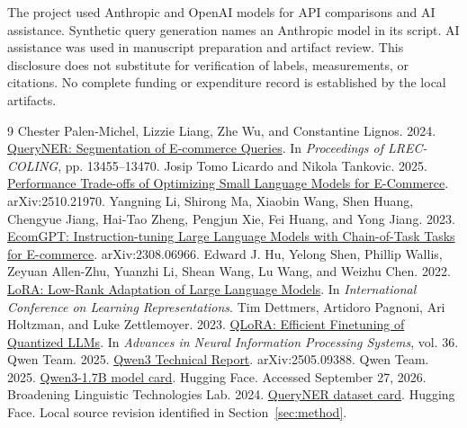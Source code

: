 \documentclass{article}
\begin{document}
\begin{ack}
The project used Anthropic and OpenAI models for API comparisons and AI assistance. Synthetic query generation names an Anthropic model in its script. AI assistance was used in manuscript preparation and artifact review. This disclosure does not substitute for verification of labels, measurements, or citations. No complete funding or expenditure record is established by the local artifacts.
\end{ack}

\begin{thebibliography}{9}
 Chester Palen-Michel, Lizzie Liang, Zhe Wu, and Constantine Lignos. 2024. \href{https://aclanthology.org/2024.lrec-main.1178/}{QueryNER: Segmentation of E-commerce Queries}. In \emph{Proceedings of LREC-COLING}, pp. 13455--13470.
 Josip Tomo Licardo and Nikola Tankovic. 2025. \href{https://arxiv.org/abs/2510.21970}{Performance Trade-offs of Optimizing Small Language Models for E-Commerce}. arXiv:2510.21970.
 Yangning Li, Shirong Ma, Xiaobin Wang, Shen Huang, Chengyue Jiang, Hai-Tao Zheng, Pengjun Xie, Fei Huang, and Yong Jiang. 2023. \href{https://arxiv.org/abs/2308.06966}{EcomGPT: Instruction-tuning Large Language Models with Chain-of-Task Tasks for E-commerce}. arXiv:2308.06966.
 Edward J. Hu, Yelong Shen, Phillip Wallis, Zeyuan Allen-Zhu, Yuanzhi Li, Shean Wang, Lu Wang, and Weizhu Chen. 2022. \href{https://arxiv.org/abs/2106.09685}{LoRA: Low-Rank Adaptation of Large Language Models}. In \emph{International Conference on Learning Representations}.
 Tim Dettmers, Artidoro Pagnoni, Ari Holtzman, and Luke Zettlemoyer. 2023. \href{https://arxiv.org/abs/2305.14314}{QLoRA: Efficient Finetuning of Quantized LLMs}. In \emph{Advances in Neural Information Processing Systems}, vol. 36.
 Qwen Team. 2025. \href{https://arxiv.org/abs/2505.09388}{Qwen3 Technical Report}. arXiv:2505.09388.
 Qwen Team. 2025. \href{https://huggingface.co/Qwen/Qwen3-1.7B}{Qwen3-1.7B model card}. Hugging Face. Accessed September 27, 2026.
 Broadening Linguistic Technologies Lab. 2024. \href{https://huggingface.co/datasets/bltlab/queryner}{QueryNER dataset card}. Hugging Face. Local source revision identified in Section~\ref{sec:method}.
\end{thebibliography}

\clearpage
\appendix

\ifdefined\IncludeNeurIPSChecklist
\clearpage

\fi
\end{document}
